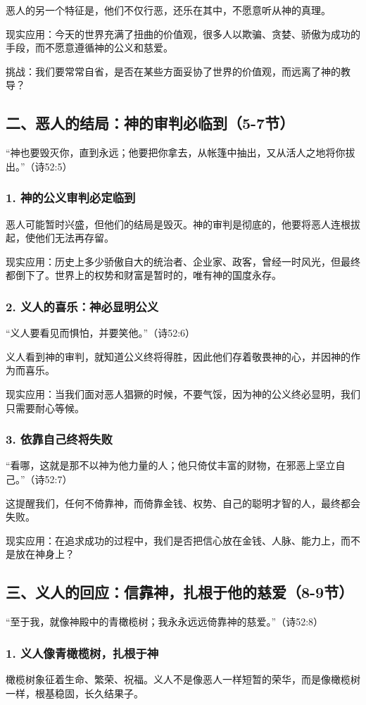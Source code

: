\documentclass[a4paper, 12pt]{article}
\begin{document}
恶人的另一个特征是，他们不仅行恶，还乐在其中，不愿意听从神的真理。

现实应用：今天的世界充满了扭曲的价值观，很多人以欺骗、贪婪、骄傲为成功的手段，而不愿意遵循神的公义和慈爱。

挑战：我们要常常自省，是否在某些方面妥协了世界的价值观，而远离了神的教导？
\subsection*{二、恶人的结局：神的审判必临到（5-7节）}
“神也要毁灭你，直到永远；他要把你拿去，从帐篷中抽出，又从活人之地将你拔出。”（诗52:5）

\subsubsection*{1. 神的公义审判必定临到}
\hspace{0.6cm}恶人可能暂时兴盛，但他们的结局是毁灭。神的审判是彻底的，他要将恶人连根拔起，使他们无法再存留。

现实应用：历史上多少骄傲自大的统治者、企业家、政客，曾经一时风光，但最终都倒下了。世界上的权势和财富是暂时的，唯有神的国度永存。
\subsubsection*{2. 义人的喜乐：神必显明公义}
“义人要看见而惧怕，并要笑他。”（诗52:6）

义人看到神的审判，就知道公义终将得胜，因此他们存着敬畏神的心，并因神的作为而喜乐。

现实应用：当我们面对恶人猖獗的时候，不要气馁，因为神的公义终必显明，我们只需要耐心等候。
\subsubsection*{3. 依靠自己终将失败}
“看哪，这就是那不以神为他力量的人；他只倚仗丰富的财物，在邪恶上坚立自己。”（诗52:7）

这提醒我们，任何不倚靠神，而倚靠金钱、权势、自己的聪明才智的人，最终都会失败。

现实应用：在追求成功的过程中，我们是否把信心放在金钱、人脉、能力上，而不是放在神身上？
\subsection*{三、义人的回应：信靠神，扎根于他的慈爱（8-9节）}
“至于我，就像神殿中的青橄榄树；我永永远远倚靠神的慈爱。”（诗52:8）

\subsubsection*{1. 义人像青橄榄树，扎根于神}
\hspace{0.6cm}橄榄树象征着生命、繁荣、祝福。义人不是像恶人一样短暂的荣华，而是像橄榄树一样，根基稳固，长久结果子。
\end{document}
